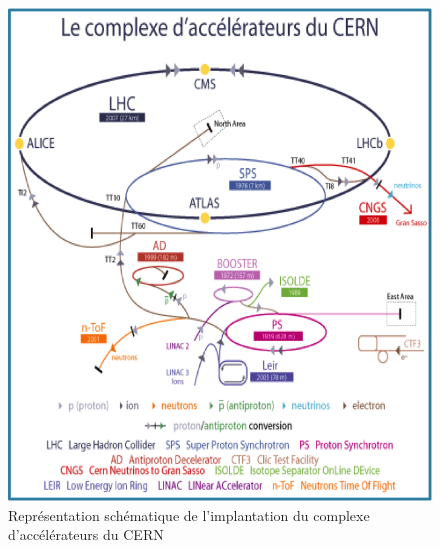 \begin{figure}[htb]
\centering
\includegraphics[scale=0.8]{fig/CERN.png}
\caption{Représentation schématique de l'implantation du complexe d'accélérateurs du CERN}
\label{CERN}
\end{figure}
